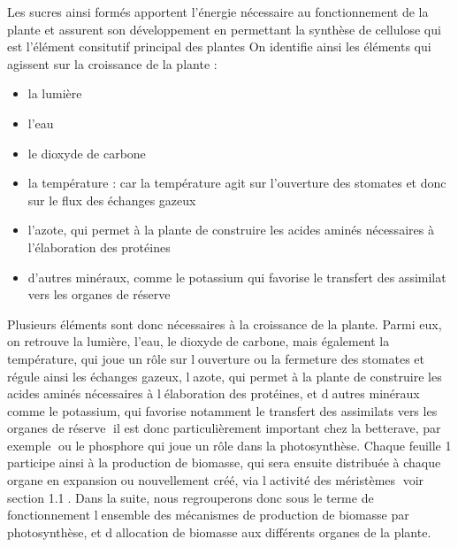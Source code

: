 Les sucres ainsi formés apportent l'énergie nécessaire au fonctionnement de la plante et assurent son développement en permettant la synthèse de cellulose qui est l'élément consitutif principal des plantes 
On identifie ainsi les éléments qui agissent sur la croissance de la plante : 
\begin{itemize}
	\item la lumière
	\item l'eau
	\item le dioxyde de carbone
	\item la température : car la température agit sur l'ouverture des stomates et donc sur le flux des échanges gazeux
	\item l'azote, qui permet à la plante de construire les acides aminés nécessaires à l'élaboration des protéines
	\item d'autres minéraux, comme le potassium qui favorise le transfert des assimilat vers les organes de réserve
\end{itemize}
Plusieurs éléments sont donc nécessaires à la croissance de la plante. Parmi eux, on retrouve la lumière, l'eau, le dioxyde de carbone, mais également la température, qui joue un rôle sur louverture ou la fermeture des stomates et régule ainsi les échanges gazeux, lazote, qui permet à la plante de construire les acides aminés nécessaires à lélaboration des protéines, et dautres minéraux comme le potassium, qui favorise notamment le transfert des assimilats vers les organes de réserve il est donc particulièrement important chez la betterave, par exemple ou le phosphore qui joue un rôle dans la photosynthèse.
Chaque feuille 1 participe ainsi à la production de biomasse, qui sera ensuite distribuée à chaque organe en expansion ou nouvellement créé, via lactivité des méristèmes voir section 1.1. Dans la suite, nous regrouperons donc sous le terme de fonctionnement lensemble des mécanismes de production de biomasse par photosynthèse, et dallocation de biomasse aux différents organes de la plante.

